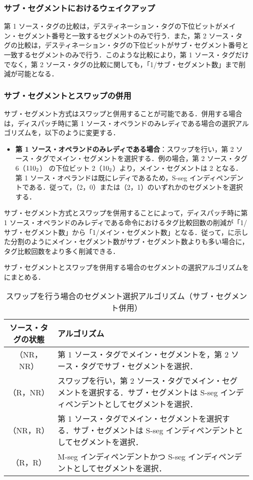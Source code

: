 \subsubsection{サブ・セグメントにおけるウェイクアップ}
第 1 ソース・タグの比較は，デスティネーション・タグの下位ビットがメイン・セグメント番号と一致するセグメントのみで行う．また，第 2 ソース・タグの比較は，デスティネーション・タグの下位ビットがサブ・セグメント番号と一致するセグメントのみで行う．このような比較により，第 1 ソース・タグだけでなく，第 2  ソース・タグの比較に関しても，「1/サブ・セグメント数」まで削減が可能となる．

\subsubsection{サブ・セグメントとスワップの併用}
サブ・セグメント方式はスワップと併用することが可能である．併用する場合は，ディスパッチ時に第 1 ソース・オペランドのみレディである場合の選択アルゴリズムを，以下のように変更する．
\begin{itemize}
  \item \textbf{第 1 ソース・オペランドのみレディである場合}：スワップを行い，第 2 ソース・タグでメイン・セグメントを選択する．例の場合，第 2 ソース・タグ 6（${\rm 110_2}$） の下位ビット 2（${\rm 10_2}$）より，メイン・セグメントは 2 となる．第 1 ソース・オペランドは既にレディであるため，S-seg インディペンデントである．従って，（2，0）または（2，1）のいずれかのセグメントを選択する．
\end{itemize}
サブ・セグメント方式とスワップを併用することによって，ディスパッチ時に第 1 ソース・オペランドのみレディである命令におけるタグ比較回数の削減が「1/サブ・セグメント数」から「1/メイン・セグメント数」となる．従って，に示した分割のようにメイン・セグメント数がサブ・セグメント数よりも多い場合に，タグ比較回数をより多く削減できる．

サブ・セグメントとスワップを併用する場合のセグメントの選択アルゴリズムをにまとめる．

\begin{table}[htb]
  \caption{スワップを行う場合のセグメント選択アルゴリズム（サブ・セグメント併用）}
  \footnotesize
  \center
   \begin{tabular}{|c|p{13cm}|} \hline \hline
    ソース・タグの状態 & アルゴリズム \\ \hline
    （NR，NR） & 第 1 ソース・タグでメイン・セグメントを，第 2 ソース・タグでサブ・セグメントを選択． \\ \hline
    （R，NR） & スワップを行い，第 2 ソース・タグでメイン・セグメントを選択する．サブ・セグメントは S-seg インディペンデントとしてセグメントを選択．\\ \hline
    （NR，R） & 第 1 ソース・タグでメイン・セグメントを選択する．サブ・セグメントは S-seg インディペンデントとしてセグメントを選択．\\ \hline
    （R，R） & M-seg インディペンデントかつ S-seg インディペンデントとしてセグメントを選択． \\ \hline
  \end{tabular}
  \label{tab:agg_algorithm_subseg}
\end{table}

